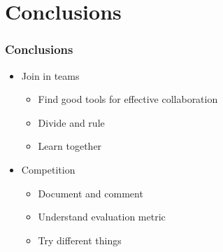 \section{Conclusions}
\begin{frame}\frametitle{Conclusions}
\begin{itemize}

\item Join in teams
\begin{itemize}
\item Find good tools for effective collaboration
\item Divide and rule
\item Learn together
\end{itemize}

\item Competition
\begin{itemize}
\item Document and comment
\item Understand evaluation metric
\item Try different things
\end{itemize}

\end{itemize}
\end{frame}